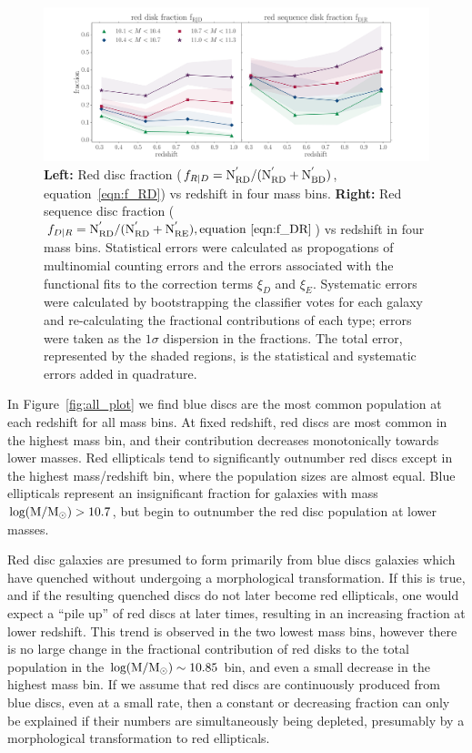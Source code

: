 \documentclass[useAMS,usenatbib]{mn2e}
\begin{document}
\begin{figure}
\centering
\includegraphics[width=\textwidth,trim={0cm 0cm 2cm 1cm},clip]{figures/red_disk_fractions.pdf}
\caption{\textbf{Left:} Red disc fraction ($f_{R|D} = \rm N^{'}_{RD}/(N^{'}_{RD}+N^{'}_{BD})$, equation~\ref{eqn:f_RD}) vs redshift in four mass bins. \textbf{Right:} Red sequence disc fraction ($f_{D|R} = \rm N^{'}_{RD}/(N^{'}_{RD}+N^{'}_{RE}), equation~\ref{eqn:f_DR}$) vs redshift in four mass bins. Statistical errors were calculated as propogations of multinomial counting errors and the errors associated with the functional fits to the correction terms $\xi_D$ and $\xi_E$. Systematic errors were calculated by bootstrapping the classifier votes for each galaxy and re-calculating the fractional contributions of each type; errors were taken as the $1\sigma$ dispersion in the fractions. The total error, represented by the shaded regions, is the statistical and systematic errors added in quadrature.} 
\label{fig:f_results}
\end{figure}


In Figure~\ref{fig:all_plot} we find blue discs are the most common population at each redshift for all mass bins. At fixed redshift, red discs are most common in the highest mass bin, and their contribution decreases monotonically towards lower masses. Red ellipticals tend to significantly outnumber red discs except in the highest mass/redshift bin, where the population sizes are almost equal. Blue ellipticals represent an insignificant fraction for galaxies with mass $\rm log(M/M_{\odot})>10.7$, but begin to outnumber the red disc population at lower masses. 


Red disc galaxies are presumed to form primarily from blue discs galaxies which have quenched without undergoing a morphological transformation. If this is true, and if the resulting quenched discs do not later become red ellipticals, one would expect a ``pile up'' of red discs at later times, resulting in an increasing fraction at lower redshift. This trend is observed in the two lowest mass bins, however there is no large change in the fractional contribution of red disks to the total population in the $\rm log(M/M_{\odot})\sim10.85$ bin, and even a small decrease in the highest mass bin. If we assume that red discs are continuously produced from blue discs, even at a small rate, then a constant or decreasing fraction can only be explained if their numbers are simultaneously being depleted, presumably by a morphological transformation to red ellipticals.
\end{document}
